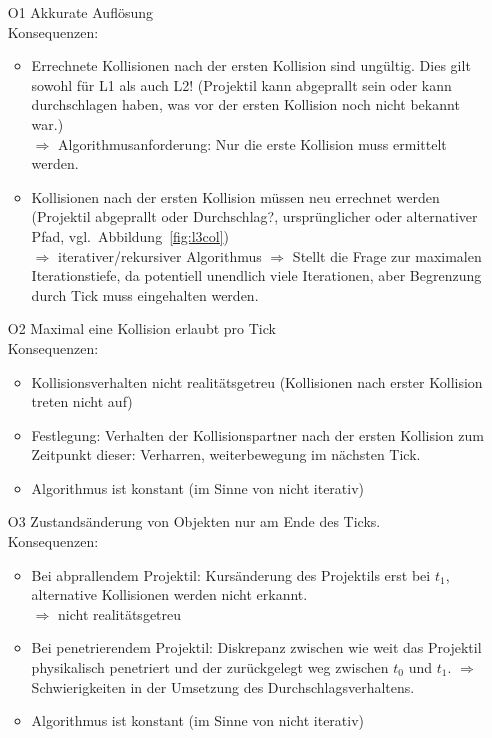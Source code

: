 \begin{itemize}
	\item[O1] Akkurate Auflösung\\
		Konsequenzen:
		\begin{itemize}
			\item Errechnete Kollisionen nach der ersten Kollision sind ungültig. Dies gilt sowohl für L1 als auch L2! (Projektil kann abgeprallt sein oder kann durchschlagen haben, was vor der ersten Kollision noch nicht bekannt war.)\\
				$\Rightarrow$ Algorithmusanforderung: Nur die erste Kollision muss ermittelt werden.
			\item Kollisionen nach der ersten Kollision müssen neu errechnet werden (Projektil abgeprallt oder Durchschlag?, ursprünglicher oder alternativer Pfad, vgl.~Abbildung~\ref{fig:l3col})\\
				$\Rightarrow$ iterativer/rekursiver Algorithmus $\Rightarrow$ Stellt die Frage zur maximalen Iterationstiefe, da potentiell unendlich viele Iterationen, aber Begrenzung durch Tick muss eingehalten werden.
		\end{itemize}

	\item[O2] Maximal eine Kollision erlaubt pro Tick\\
		Konsequenzen:
		\begin{itemize}
			\item Kollisionsverhalten nicht realitätsgetreu (Kollisionen nach erster Kollision treten nicht auf)
			\item Festlegung: Verhalten der Kollisionspartner nach der ersten Kollision zum Zeitpunkt dieser: Verharren, weiterbewegung im nächsten Tick.
			\item Algorithmus ist konstant (im Sinne von nicht iterativ)
		\end{itemize}
	\item[O3] Zustandsänderung von Objekten nur am Ende des Ticks.\\
		Konsequenzen:
		\begin{itemize}
			\item Bei abprallendem Projektil: Kursänderung des Projektils erst bei $t_1$, alternative Kollisionen werden nicht erkannt.\\
				$\Rightarrow$ nicht realitätsgetreu
			\item Bei penetrierendem Projektil: Diskrepanz zwischen wie weit das Projektil physikalisch penetriert und der zurückgelegt weg zwischen $t_0$ und $t_1$.
				$\Rightarrow$ Schwierigkeiten in der Umsetzung des Durchschlagsverhaltens.
			\item Algorithmus ist konstant (im Sinne von nicht iterativ)
		\end{itemize}
\end{itemize}


